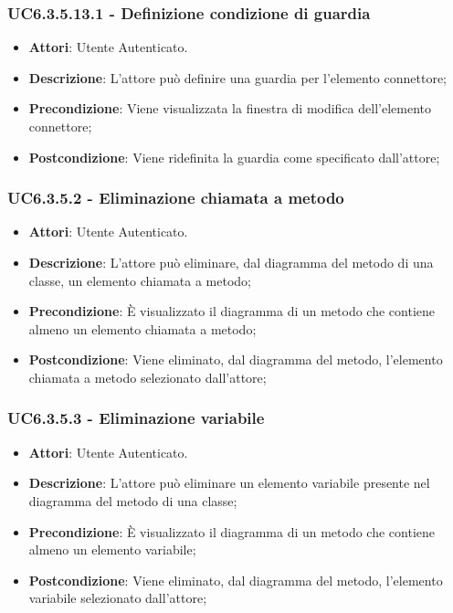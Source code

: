 \subsubsection{UC6.3.5.13.1 - Definizione condizione di guardia} 
\label{sssec:UC6.3.5.13.1} 
\begin{itemize} 
\item \textbf{Attori}: Utente Autenticato.
\item \textbf{Descrizione}: L'attore può definire una guardia per l'elemento connettore;
\item \textbf{Precondizione}: Viene visualizzata la finestra di modifica dell'elemento connettore;
\item \textbf{Postcondizione}: Viene ridefinita la guardia come specificato dall'attore;
\end{itemize} 
\subsubsection{UC6.3.5.2 - Eliminazione chiamata a metodo} 
\label{sssec:UC6.3.5.2} 
\begin{itemize} 
\item \textbf{Attori}: Utente Autenticato.
\item \textbf{Descrizione}: L'attore può eliminare, dal diagramma del metodo di una classe, un elemento chiamata a metodo;
\item \textbf{Precondizione}: È visualizzato il diagramma di un metodo che contiene almeno un elemento chiamata a metodo;
\item \textbf{Postcondizione}: Viene eliminato, dal diagramma del metodo,  l'elemento chiamata a metodo selezionato dall'attore;
\end{itemize} 
\subsubsection{UC6.3.5.3 - Eliminazione variabile} 
\label{sssec:UC6.3.5.3} 
\begin{itemize} 
\item \textbf{Attori}: Utente Autenticato.
\item \textbf{Descrizione}: L'attore può eliminare un elemento variabile presente nel diagramma del metodo di una classe;
\item \textbf{Precondizione}: È visualizzato il diagramma di un metodo che contiene almeno un elemento variabile;
\item \textbf{Postcondizione}: Viene eliminato, dal diagramma del metodo,  l'elemento variabile selezionato dall'attore;
\end{itemize} 
